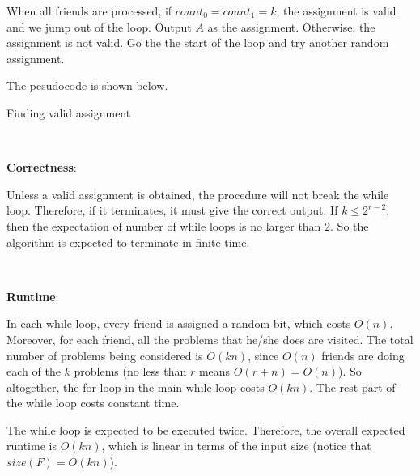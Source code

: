 \documentclass{article}
\begin{document}
When all friends are processed, if $count_0=count_1=k$, the assignment is valid and we jump out of the loop. Output $A$ as the assignment. Otherwise, the assignment is not valid. Go the the start of the loop and try another random assignment.

The pesudocode is shown below.
\begin{algorithm}
\caption{Finding valid assignment}
\begin{algorithmic}[1]
				\EndIf
			\EndFor
		\Else{}
				\EndIf
			\EndFor
		\EndIf
	\EndFor
	\EndIf
\EndWhile
{}
\EndProcedure
\end{algorithmic}
\end{algorithm}

~

\noindent\textbf{Correctness}:

Unless a valid assignment is obtained, the procedure will not break the while loop. Therefore, if it terminates, it must give the correct output. If $k\leqslant 2^{r-2}$, then the expectation of number of while loops is no larger than $2$. So the algorithm is expected to terminate in finite time.

~

\noindent\textbf{Runtime}:

In each while loop, every friend is assigned a random bit, which costs $O(n)$. Moreover, for each friend, all the problems that he/she does are visited. The total number of problems being considered is $O(kn)$, since $O(n)$ friends are doing each of the $k$ problems (no less than $r$ means $O(r+n)=O(n)$). So altogether, the for loop in the main while loop costs $O(kn)$. The rest part of the while loop costs constant time.

The while loop is expected to be executed twice. Therefore, the overall expected runtime is $O(kn)$, which is linear in terms of the input size (notice that $size(F)=O(kn)$).
\end{document}
